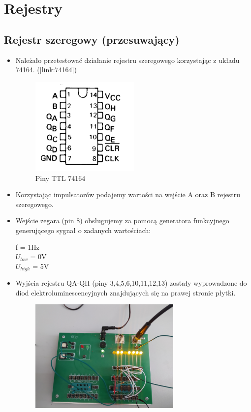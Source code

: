 \chapter{Rejestry}

\section{Rejestr szeregowy (przesuwający)}

\begin{itemize}
    \item Należało przetestować działanie rejestru szeregowego korzystając z układu 74164. (\ref{link:74164})
        \begin{figure}[H]
            \centering
            \includegraphics[width=0.5\textwidth]{img/schemes/74164_pins.png}
            \caption{Piny TTL 74164}
            \label{rejestr_szeregowy:piny}
        \end{figure}
    \item Korzystając impulsatorów podajemy wartości na wejście A oraz B rejestru szeregowego.
    \item Wejście zegara (pin 8) obsługujemy za pomocą generatora funkcyjnego generującego sygnał o zadanych wartościach:
        \begin{center}
            f = 1Hz \\
            $U_{low}$ = 0V \\
            $U_{high}$ = 5V
        \end{center}
    \item Wyjścia rejestru QA-QH (piny 3,4,5,6,10,11,12,13) zostały wyprowadzone do diod elektroluminescencyjnych znajdujących się na prawej stronie płytki.
        \begin{figure}[H]
            \centering
            \includegraphics[width=0.7\textwidth]{img/74164/1653500524524_scaled.png}

\end{figure}
\end{itemize}
